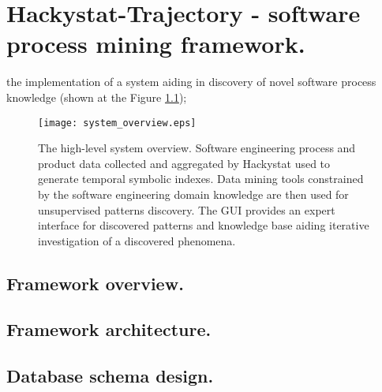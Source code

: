 \chapter{Hackystat-Trajectory - software process mining framework.}
the implementation of a system aiding in discovery of novel software process knowledge (shown at the Figure \ref{fig:system_overview});

\begin{figure}[tbp]
   \centering
   \texttt{[image: system\_overview.eps]}
   \caption{The high-level system overview. Software engineering process and product data collected and aggregated by Hackystat used to generate temporal symbolic indexes. Data mining tools constrained by the software engineering domain knowledge are then used for unsupervised patterns discovery. The GUI provides an expert interface for discovered patterns and knowledge base aiding iterative investigation of a discovered phenomena.}
   \label{fig:system_overview}
\end{figure}

\section{Framework overview.}

\section{Framework architecture.}

\section{Database schema design.}